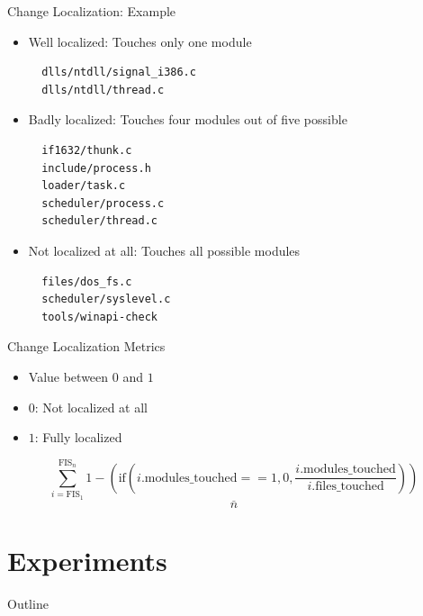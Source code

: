 \note{
}

\begin{frame}[containsverbatim]{Change Localization: Example}
  \begin{itemize}
  \item Well localized: Touches only one module
\begin{verbatim}
  dlls/ntdll/signal_i386.c
  dlls/ntdll/thread.c
\end{verbatim}
  \item Badly localized: Touches four modules out of five possible
\begin{verbatim}
  if1632/thunk.c
  include/process.h
  loader/task.c
  scheduler/process.c
  scheduler/thread.c
\end{verbatim}
  \item Not localized at all: Touches all possible modules
\begin{verbatim}
  files/dos_fs.c
  scheduler/syslevel.c
  tools/winapi-check  
\end{verbatim}
  \end{itemize}
\end{frame}

\note{
}

\begin{frame}{Change Localization Metrics}
  \begin{itemize}
  \item Value between $0$ and $1$
  \item $0$: Not localized at all
  \item $1$: Fully localized
  \end{itemize}


  \[
  \underline{\sum_{i = \text{FIS}_1}^{\text{FIS}_n} 1 -
    \left(\text{if}\left( i.\text{modules\_touched} == 1, 0,
        \frac{i.\text{modules\_touched}}{i.\text{files\_touched}}
      \right) \right)}
  \]
  \[
  n
  \]
\end{frame}

\note{
}


\section{Experiments}

\begin{frame}{Outline}
  \tableofcontents[current]
\end{frame}

\note{
}

